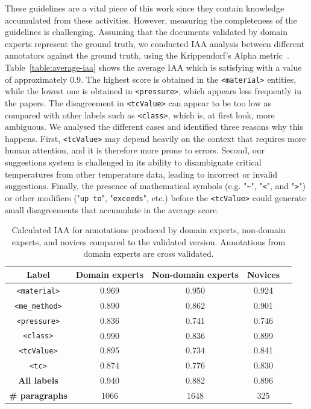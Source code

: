 These guidelines are a vital piece of this work since they contain knowledge accumulated from these activities.
However, measuring the completeness of the guidelines is challenging. 
Assuming that the documents validated by domain experts represent the ground truth, we conducted IAA analysis between different annotators against the ground truth, using the Krippendorf's Alpha metric~\cite{Krippendorff2004ReliabilityIC}.
Table~\ref{table:average-iaa} shows the average IAA which is satisfying with a value of approximately 0.9. 
The highest score is obtained in the \texttt{<material>} entities, while the lowest one is obtained in \texttt{<pressure>}, which appears less frequently in the papers. 
The disagreement in \texttt{<tcValue>} can appear to be too low as compared with other labels such as \texttt{<class>}, which is, at first look, more ambiguous. 
We analysed the different cases and identified three reasons why this happens. 
First, \texttt{<tcValue>} may depend heavily on the context that requires more human attention, and it is therefore more prone to errors. 
Second, our suggestions system is challenged in its ability to disambiguate critical temperatures from other temperature data, leading to incorrect or invalid suggestions. 
Finally, the presence of mathematical symbols (e.g. "\texttt{\~}", "\texttt{<}", and "\texttt{>}") or other modifiers ("\texttt{up to}", "\texttt{exceeds}", etc.) before the \texttt{<tcValue>} could generate small disagreements that accumulate in the average score. 

\begin{table}[htbp]
    \centering
    \caption{Calculated IAA for annotations produced by domain experts, non-domain experts, and novices compared to the validated version. Annotations from domain experts are cross validated. }
    \begin{tabular}{ ccccc } 
    \toprule
        \textbf{Label} & \textbf{Domain experts} & \textbf{Non-domain experts} & \textbf{Novices}\\
    \midrule
        \texttt{<material>}     &   0.969   & 0.950    &   0.924   \\
        \texttt{<me\_method>}   &   0.890   & 0.862    &   0.901   \\
        \texttt{<pressure>}     &   0.836   & 0.741    &   0.746   \\
        \texttt{<class>}        &   0.990   & 0.836	   &   0.899   \\
        \texttt{<tcValue>}      &   0.895   & 0.734	   &   0.841   \\
        \texttt{<tc>}           &   0.874   & 0.776	   &   0.830   \\
    \midrule
        \textbf{All labels}        &	0.940   &   0.882	&      0.896   \\
    \midrule
        \textbf{\# paragraphs}  &   1066   &  1648	    &   325     \\
    \bottomrule
    \end{tabular}
   
    \label{table:comparison-iaa-nde-de}
\end{table}

